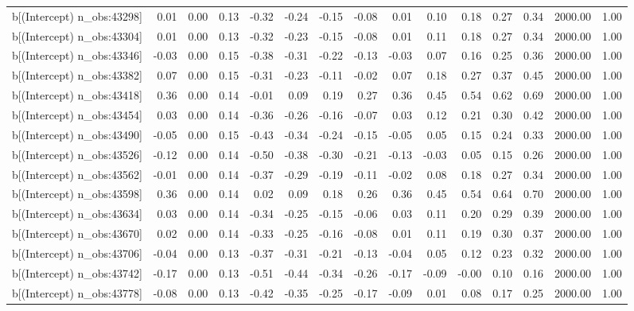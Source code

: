 \begin{table}[ht]
\begin{tabular}{rrrrrrrrrrrrrrr}
  b[(Intercept) n\_obs:43298] & 0.01 & 0.00 & 0.13 & -0.32 & -0.24 & -0.15 & -0.08 & 0.01 & 0.10 & 0.18 & 0.27 & 0.34 & 2000.00 & 1.00 \\ 
  b[(Intercept) n\_obs:43304] & 0.01 & 0.00 & 0.13 & -0.32 & -0.23 & -0.15 & -0.08 & 0.01 & 0.11 & 0.18 & 0.27 & 0.34 & 2000.00 & 1.00 \\ 
  b[(Intercept) n\_obs:43346] & -0.03 & 0.00 & 0.15 & -0.38 & -0.31 & -0.22 & -0.13 & -0.03 & 0.07 & 0.16 & 0.25 & 0.36 & 2000.00 & 1.00 \\ 
  b[(Intercept) n\_obs:43382] & 0.07 & 0.00 & 0.15 & -0.31 & -0.23 & -0.11 & -0.02 & 0.07 & 0.18 & 0.27 & 0.37 & 0.45 & 2000.00 & 1.00 \\ 
  b[(Intercept) n\_obs:43418] & 0.36 & 0.00 & 0.14 & -0.01 & 0.09 & 0.19 & 0.27 & 0.36 & 0.45 & 0.54 & 0.62 & 0.69 & 2000.00 & 1.00 \\ 
  b[(Intercept) n\_obs:43454] & 0.03 & 0.00 & 0.14 & -0.36 & -0.26 & -0.16 & -0.07 & 0.03 & 0.12 & 0.21 & 0.30 & 0.42 & 2000.00 & 1.00 \\ 
  b[(Intercept) n\_obs:43490] & -0.05 & 0.00 & 0.15 & -0.43 & -0.34 & -0.24 & -0.15 & -0.05 & 0.05 & 0.15 & 0.24 & 0.33 & 2000.00 & 1.00 \\ 
  b[(Intercept) n\_obs:43526] & -0.12 & 0.00 & 0.14 & -0.50 & -0.38 & -0.30 & -0.21 & -0.13 & -0.03 & 0.05 & 0.15 & 0.26 & 2000.00 & 1.00 \\ 
  b[(Intercept) n\_obs:43562] & -0.01 & 0.00 & 0.14 & -0.37 & -0.29 & -0.19 & -0.11 & -0.02 & 0.08 & 0.18 & 0.27 & 0.34 & 2000.00 & 1.00 \\ 
  b[(Intercept) n\_obs:43598] & 0.36 & 0.00 & 0.14 & 0.02 & 0.09 & 0.18 & 0.26 & 0.36 & 0.45 & 0.54 & 0.64 & 0.70 & 2000.00 & 1.00 \\ 
  b[(Intercept) n\_obs:43634] & 0.03 & 0.00 & 0.14 & -0.34 & -0.25 & -0.15 & -0.06 & 0.03 & 0.11 & 0.20 & 0.29 & 0.39 & 2000.00 & 1.00 \\ 
  b[(Intercept) n\_obs:43670] & 0.02 & 0.00 & 0.14 & -0.33 & -0.25 & -0.16 & -0.08 & 0.01 & 0.11 & 0.19 & 0.30 & 0.37 & 2000.00 & 1.00 \\ 
  b[(Intercept) n\_obs:43706] & -0.04 & 0.00 & 0.13 & -0.37 & -0.31 & -0.21 & -0.13 & -0.04 & 0.05 & 0.12 & 0.23 & 0.32 & 2000.00 & 1.00 \\ 
  b[(Intercept) n\_obs:43742] & -0.17 & 0.00 & 0.13 & -0.51 & -0.44 & -0.34 & -0.26 & -0.17 & -0.09 & -0.00 & 0.10 & 0.16 & 2000.00 & 1.00 \\ 
  b[(Intercept) n\_obs:43778] & -0.08 & 0.00 & 0.13 & -0.42 & -0.35 & -0.25 & -0.17 & -0.09 & 0.01 & 0.08 & 0.17 & 0.25 & 2000.00 & 1.00 \\ 

\end{tabular}
\end{table}
